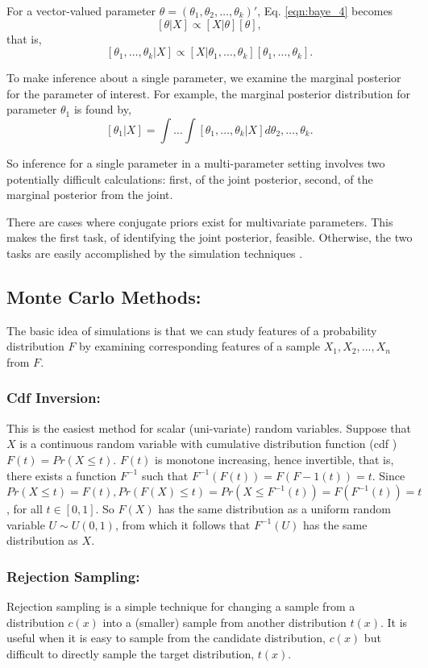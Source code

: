 \documentclass[12pt,oneside,a4paper]{book}
\theoremstyle{definition}
\theoremstyle{remark}
\begin{document}
					For a vector-valued parameter $\theta = (\theta_1,\theta_2,\dots,\theta_k)'$, Eq. \eqref{eqn:baye_4} becomes \[[\theta|X] \propto [X|\theta][\theta],\] that is, \[ [\theta_1,\dots,\theta_k|X] \propto [X|\theta_1,\dots,\theta_k][\theta_1,\dots,\theta_k]. \]

					To make inference about a single parameter, we examine the marginal posterior for the parameter of interest. For example, the marginal posterior distribution for parameter $\theta_1$ is found by, \[ [\theta_1|X] = \int\dots\int [\theta_1,\dots,\theta_k|X]d\theta_2,\dots, \theta_k. \]

					So inference for a single parameter in a multi-parameter setting involves two potentially difficult calculations: first, of the joint posterior, second, of the marginal posterior from the joint.

					There are cases where conjugate priors exist for multivariate parameters. This makes the first task, of identifying the joint posterior, feasible. Otherwise, the two tasks are easily accomplished by the simulation techniques \cite{link2009bayesian}.


			\subsection{Monte Carlo Methods:}
				The basic idea of simulations is that we can study features of a probability distribution $F$ 	by examining corresponding features of a sample $X_1, X_2, . . . , X_n$ from $F$.

				\subsubsection{Cdf Inversion:}
					This is the easiest method for scalar (uni-variate) random variables.
					Suppose that $X$ is a continuous random variable with cumulative distribution function (cdf ) $F(t) = Pr(X \le t)$.
					$F(t)$ is monotone increasing, hence invertible, that is, there exists a function $F^{-1}$ such that $F^{-1}(F(t)) = F(F-1(t)) = t$.
					Since $Pr(X \le t) = F(t), Pr(F(X) \le t) = Pr(X \le F^{-1}(t)) = F(F^{-1}(t)) = t$, for all $t\in [0, 1]$. So $F(X)$ has the same distribution as a uniform random variable $U \sim U(0,1)$, from which it follows that $F^{-1}(U)$ has the same distribution as $X$.

				\subsubsection{Rejection Sampling:}
					Rejection sampling is a simple technique for changing a sample from a distribution $c(x)$ into a (smaller) sample from another distribution $t(x)$. It is useful when it is easy to sample from the candidate distribution, $c(x)$ but difficult to directly sample the target distribution, $t(x)$.
\end{document}
